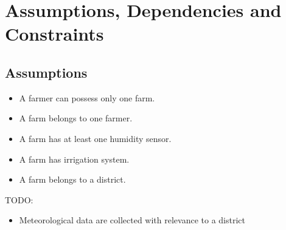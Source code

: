 \section{Assumptions, Dependencies and Constraints}


\subsection{Assumptions}
\begin{itemize}
    \item A farmer can possess only one farm.
    \item A farm belongs to one farmer.
    \item A farm has at least one humidity sensor.
    \item A farm has irrigation system.
    \item A farm belongs to a district.
\end{itemize}
TODO:
\begin{itemize}
    \item Meteorological data are collected with relevance to a district
\end{itemize}